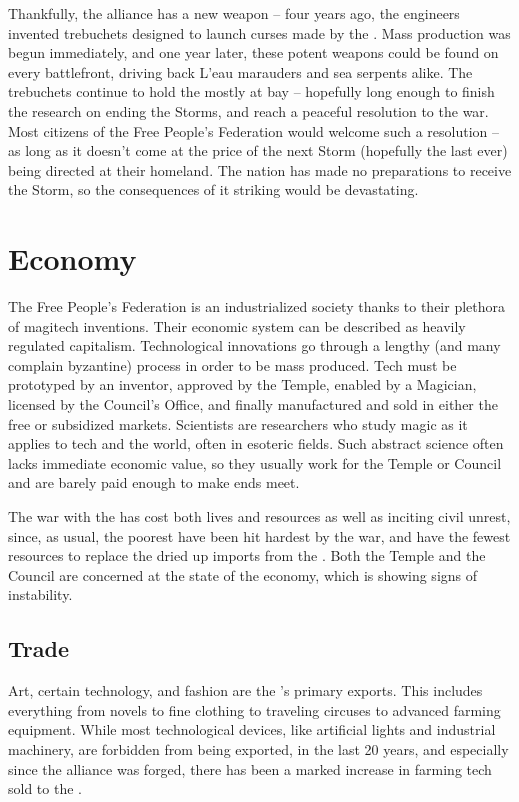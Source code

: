 \documentclass[blue]{GL2020}
\begin{document}
Thankfully, the alliance has a new weapon – four years ago, the \pTech{} engineers invented trebuchets designed to launch curses made by the \pFarm{}.  Mass production was begun immediately, and one year later, these potent weapons could be found on every battlefront, driving back L'eau marauders and sea serpents alike.  The trebuchets continue to hold the \pShip{} mostly at bay -- hopefully long enough to finish the research on ending the Storms, and reach a peaceful resolution to the war.  Most citizens of the Free People's Federation would welcome such a resolution – as long as it doesn't come at the price of the next Storm (hopefully the last ever) being directed at their homeland.  The nation has made no preparations to receive the Storm, so the consequences of it striking would be devastating.
	
\section*{Economy}
The Free People's Federation is an industrialized society thanks to their plethora of magitech inventions.  Their economic system can be described as heavily regulated capitalism.  Technological innovations go through a lengthy (and many complain byzantine) process in order to be mass produced.  Tech must be prototyped by an inventor, approved by the Temple, enabled by a Magician, licensed by the Council's Office, and finally manufactured and sold in either the free or subsidized markets.  Scientists are researchers who study magic as it applies to tech and the world, often in esoteric fields.  Such abstract science often lacks immediate economic value, so they usually work for the Temple or Council and are barely paid enough to make ends meet.  

The war with the \pShip{} has cost both lives and resources as well as inciting civil unrest, since, as usual, the poorest have been hit hardest by the war, and have the fewest resources to replace the dried up imports from the \pShippies{}.  Both the Temple and the Council are concerned at the state of the economy, which is showing signs of instability.

\subsection*{Trade}
Art, certain technology, and fashion are the \pTech{}'s primary exports.  This includes everything from novels to fine clothing to traveling circuses to advanced farming equipment.  While most technological devices, like artificial lights and industrial machinery, are forbidden from being exported, in the last 20 years, and especially since the alliance was forged, there has been a marked increase in farming tech sold to the \pFarm{}.
\end{document}
